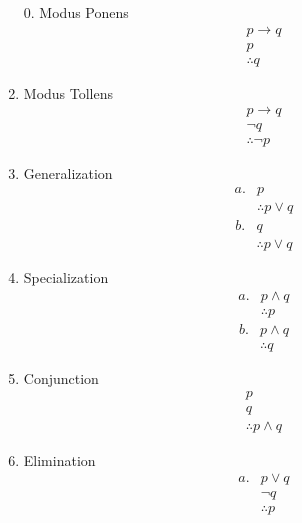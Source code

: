\documentclass[12pt]{article}
\begin{document}
\newpage

\begin{enumerate}
    \item[0.] Modus Ponens
        \[
        \begin{array}{c}
        p \rightarrow q \\
        p \\
        \therefore q
        \end{array}
        \]
    \item Modus Tollens
        \[
        \begin{array}{c}
        p \rightarrow q \\
        \neg q \\
        \therefore \neg p
        \end{array}
        \]
    \item Generalization
        \[
        \begin{array}{ll}
        a. & p \\
        & \therefore p \vee q
        \end{array}
        \]
        \[
        \begin{array}{ll}
        b. & q \\
        & \therefore p \vee q
        \end{array}
        \]
    \item Specialization
        \[
        \begin{array}{ll}
        a. & p \wedge q \\
        & \therefore p
        \end{array}
        \]
        \[
        \begin{array}{ll}
        b. & p \wedge q \\
        & \therefore q
        \end{array}
        \]
    \item Conjunction
        \[
        \begin{array}{c}
        p \\
        q \\
        \therefore p \wedge q
        \end{array}
        \]
    \item Elimination
        \[
        \begin{array}{ll}
        a. & p \vee q \\
        & \neg q \\
        & \therefore p
        \end{array}
        \]

\end{enumerate}
\end{document}

